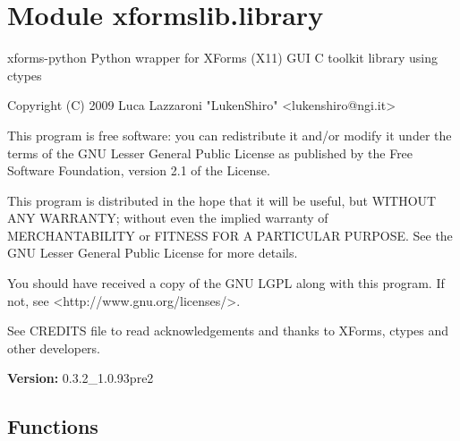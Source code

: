 %
%
%


\section{Module xformslib.library}

    \label{xformslib:library}
xforms-python Python wrapper for XForms (X11) GUI C toolkit library using 
ctypes

Copyright (C) 2009  Luca Lazzaroni "LukenShiro"  
{\textless}lukenshiro@ngi.it{\textgreater}

This program is free software: you can redistribute it and/or modify it 
under the terms of the GNU Lesser General Public License as published by 
the Free Software Foundation, version 2.1 of the License.

This program is distributed in the hope that it will be useful, but WITHOUT
ANY WARRANTY; without even the implied warranty of MERCHANTABILITY or 
FITNESS FOR A PARTICULAR PURPOSE. See the GNU Lesser General Public License
for more details.

You should have received a copy of the GNU LGPL along with this program. If
not, see {\textless}http://www.gnu.org/licenses/{\textgreater}.

See CREDITS file to read acknowledgements and thanks to XForms, ctypes and 
other developers.

\textbf{Version:} 0.3.2\_1.0.93pre2





  \subsection{Functions}

    \label{xformslib:library:get_xforms_version}

